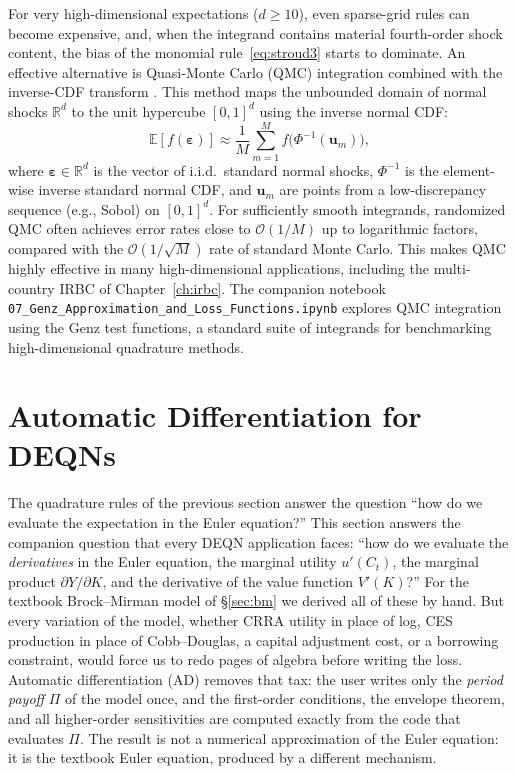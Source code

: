 \documentclass[11pt,a4paper]{report}
\newcommand{\R}{\mathbb{R}}
\newcommand{\E}[1]{\mathbb{E}\!\left[#1\right]}
\begin{document}
For very high-dimensional expectations ($d \geq 10$), even sparse-grid rules can become expensive, and, when the integrand contains material fourth-order shock content, the bias of the monomial rule~\eqref{eq:stroud3} starts to dominate.  An effective alternative is Quasi-Monte Carlo (QMC) integration combined with the inverse-CDF transform \citep[see][for a textbook treatment]{judd1998numerical}.  This method maps the unbounded domain of normal shocks $\R^{d}$ to the unit hypercube $[0,1]^{d}$ using the inverse normal CDF:
\begin{equation}
\E{f(\bm{\varepsilon})} \approx \frac{1}{M} \sum_{m=1}^{M} f\bigl(\Phi^{-1}(\bm{u}_m)\bigr),
\end{equation}
where $\bm{\varepsilon} \in \R^{d}$ is the vector of i.i.d.\ standard normal shocks, $\Phi^{-1}$ is the element-wise inverse standard normal CDF, and $\bm{u}_m$ are points from a low-discrepancy sequence (e.g., Sobol) on $[0,1]^{d}$.  For sufficiently smooth integrands, randomized QMC often achieves error rates close to $\mathcal{O}(1/M)$ up to logarithmic factors, compared with the $\mathcal{O}(1/\sqrt{M})$ rate of standard Monte Carlo.  This makes QMC highly effective in many high-dimensional applications, including the multi-country IRBC of Chapter~\ref{ch:irbc}.  The companion notebook \texttt{07\_Genz\_Approximation\_and\_Loss\_Functions.ipynb} explores QMC integration using the Genz test functions, a standard suite of integrands for benchmarking high-dimensional quadrature methods.

\section{Automatic Differentiation for DEQNs}
\label{sec:autodiff}

The quadrature rules of the previous section answer the question ``how do we evaluate the expectation in the Euler equation?''  This section answers the companion question that every DEQN application faces: ``how do we evaluate the \emph{derivatives} in the Euler equation, the marginal utility $u'(C_t)$, the marginal product $\partial Y / \partial K$, and the derivative of the value function $V'(K)$?''  For the textbook Brock--Mirman model of \S\ref{sec:bm} we derived all of these by hand.  But every variation of the model, whether CRRA utility in place of log, CES production in place of Cobb--Douglas, a capital adjustment cost, or a borrowing constraint, would force us to redo pages of algebra before writing the loss.  Automatic differentiation (AD) removes that tax: the user writes only the \emph{period payoff} $\Pi$ of the model once, and the first-order conditions, the envelope theorem, and all higher-order sensitivities are computed exactly from the code that evaluates $\Pi$.  The result is not a numerical approximation of the Euler equation: it is the textbook Euler equation, produced by a different mechanism.
\end{document}
